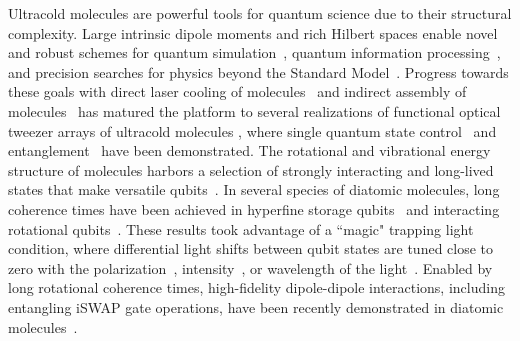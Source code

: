 \documentclass[
superscriptaddress,
twocolumn,
amsmath,amssymb,
aps,
prx,
nofootinbib,
]{revtex4-2}
\begin{document}
Ultracold molecules are powerful tools for quantum science due to their structural complexity. Large intrinsic dipole moments and rich Hilbert spaces enable novel and robust schemes for quantum simulation~\cite{wall2015quantum, micheli2006toolbox,Gorshkov2011}, quantum information processing~\cite{demille2002quantum,tesch2002quantum,wei2011entanglement,Yu2019}, and precision searches for physics beyond the Standard Model~\cite{kozyryev2017PolyEDM,Norrgard2019,Hutzler2020,kozyryev2021enhanced,demille2024quantum}. Progress towards these goals with direct laser cooling of molecules~\cite{Barry2014, anderegg2017CaFMOT, truppe2017CaF,Collopy2018,zeng2024three} and indirect assembly of molecules~\cite{ni2008high,koppinger2014production,Takekoshi2014,Park2015,Guo2016,Rvachov2017Long,voges2020ultracold,Cairncross2021Assembly} has matured the platform to several realizations of functional optical tweezer arrays of ultracold molecules \cite{Anderegg2019Optical,Cairncross2021Assembly,Zhang2022optical,ruttley2023formation,holland2023bichromatic}, where single quantum state control~\cite{park2017secondscale,Burchesky2021Rotational} and entanglement~\cite{holland2023demand,bao2023dipolar,picard2025entanglement, ruttley2025long} have been demonstrated. The rotational and vibrational energy structure of molecules harbors a selection of strongly interacting and long-lived states that make versatile qubits~\cite{tesch2002quantum,Sawant2019,albert2019robust}. In several species of diatomic molecules, long coherence times have been achieved in hyperfine storage qubits~\cite{park2017secondscale,gregory2021robust} and interacting rotational qubits~\cite{Burchesky2021Rotational, park2023extended,Gregory2024}. These results took advantage of a ``magic" trapping light condition, where differential light shifts between qubit states are tuned close to zero with the polarization~\cite{neyenhuis2012anisotropic, seesselberg2018extending, Burchesky2021Rotational, gregory2021robust, park2023extended}, intensity~\cite{Blackmore2018}, or wavelength of the light~\cite{Bause2020tuneout,guan2021magic,Gregory2024}. Enabled by long rotational coherence times, high-fidelity dipole-dipole interactions, including entangling iSWAP gate operations, have been recently demonstrated in diatomic molecules~\cite{holland2023demand,bao2023dipolar,picard2025entanglement,ruttley2025long}.
\end{document}
